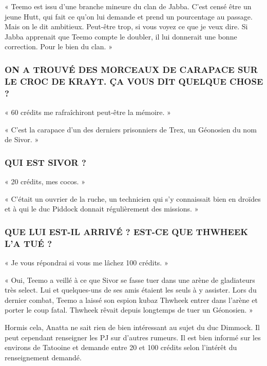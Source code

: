 \documentclass[a4paper,10pt,twoside,twocolumn,openany]{book}
\begin{document}
« Teemo est issu d’une branche mineure du clan de
Jabba. C’est censé être un jeune Hutt, qui fait ce qu’on
lui demande et prend un pourcentage au passage. Mais
on le dit ambitieux. Peut-être trop, si vous voyez ce que
je veux dire. Si Jabba apprenait que Teemo compte le
doubler, il lui donnerait une bonne correction. Pour le
bien du clan. »

\subsubsection{ON A TROUVÉ DES MORCEAUX DE CARAPACE
SUR LE CROC DE KRAYT. ÇA VOUS DIT QUELQUE
CHOSE ?}
« 60 crédits me rafraîchiront peut-être la mémoire. »

« C’est la carapace d’un des derniers prisonniers de
Trex, un Géonosien du nom de Sivor. »

\subsubsection{QUI EST SIVOR ?}

« 20 crédits, mes cocos. »

« C’était un ouvrier de la ruche, un technicien qui s’y
connaissait bien en droïdes et à qui le duc Piddock donnait régulièrement des missions. »

\subsubsection{QUE LUI EST-IL ARRIVÉ ? EST-CE QUE THWHEEK
L’A TUÉ ?}

« Je vous répondrai si vous me lâchez 100 crédits. »

« Oui, Teemo a veillé à ce que Sivor se fasse tuer dans
une arène de gladiateurs très select. Lui et quelques-uns
de ses amis étaient les seuls à y assister. Lors du dernier
combat, Teemo a laissé son espion kubaz Thwheek entrer dans l’arène et porter le coup fatal. Thwheek rêvait
depuis longtemps de tuer un Géonosien. »

Hormis cela, Anatta ne sait rien de bien intéressant
au sujet du duc Dimmock. Il peut cependant renseigner
les PJ sur d’autres rumeurs. Il est bien informé sur les
environs de Tatooine et demande entre 20 et 100 crédits
selon l’intérêt du renseignement demandé.
\end{document}
